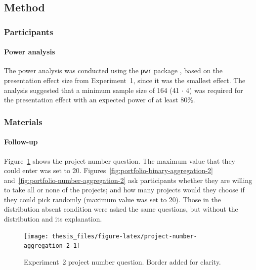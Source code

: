 \documentclass[a4paper, nobind, dvipsnames]{templates/ociamthesis}
\theoremstyle{definition}
\theoremstyle{definition}
\theoremstyle{definition}
\theoremstyle{definition}
\theoremstyle{remark}
\begin{document}
\subsection{Method}

\subsubsection{Participants}

\hypertarget{power-analysis-aggregation-2}{%
\paragraph{Power analysis}\label{power-analysis-aggregation-2}}

The power analysis was conducted using the \texttt{pwr} package \autocite{champely2020}, based
on the presentation effect size from Experiment~1, since it was the smallest
effect. The analysis suggested that a minimum sample size of
164 (41 \(\cdot\) 4) was required for
the presentation effect with an expected power of at least 80\%.

\subsubsection{Materials}

\hypertarget{follow-up-materials-aggregation-2-appendix}{%
\paragraph{Follow-up}\label{follow-up-materials-aggregation-2-appendix}}

Figure~\ref{fig:project-number-aggregation-2} shows the project number
question. The maximum value that they could enter was set to 20.
Figures~\ref{fig:portfolio-binary-aggregation-2}
and~\ref{fig:portfolio-number-aggregation-2} ask participants whether they are
willing to take all or none of the projects; and how many projects would they
choose if they could pick randomly (maximum value was set to 20). Those in the
distribution absent condition were asked the same questions, but without the
distribution and its explanation.



\begin{figure}
\texttt{[image: thesis\_files/figure-latex/project-number-aggregation-2-1]} \caption{Experiment~2 project number question. Border added for clarity.}\label{fig:project-number-aggregation-2}
\end{figure}
\end{document}
